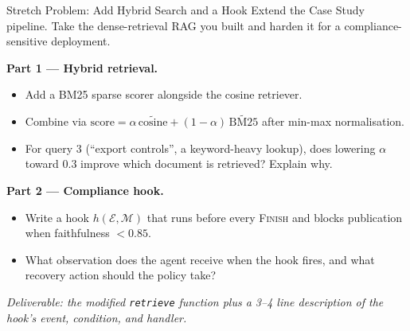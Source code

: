 \documentclass[9pt,t]{beamer}
\begin{document}
\begin{frame}[noframenumbering]{Stretch Problem: Add Hybrid Search and a Hook}
Extend the Case Study pipeline. Take the dense-retrieval RAG you built and harden it
for a compliance-sensitive deployment.

\medskip
\textbf{Part 1 --- Hybrid retrieval.}
\begin{itemize}
  \item Add a BM25 sparse scorer alongside the cosine retriever.
  \item Combine via $\text{score} = \alpha\,\widetilde{\text{cosine}}
        + (1-\alpha)\,\widetilde{\text{BM25}}$ after min-max normalisation.
  \item For query 3 (``export controls'', a keyword-heavy lookup), does lowering
        $\alpha$ toward $0.3$ improve which document is retrieved? Explain why.
\end{itemize}

\medskip
\textbf{Part 2 --- Compliance hook.}
\begin{itemize}
  \item Write a hook $h(\mathcal{E}, \mathcal{M})$ that runs before every
        \textsc{Finish} and blocks publication when faithfulness $< 0.85$.
  \item What observation does the agent receive when the hook fires, and what
        recovery action should the policy take?
\end{itemize}

\medskip
\textit{Deliverable: the modified \texttt{retrieve} function plus a 3--4 line
description of the hook's event, condition, and handler.}
\end{frame}
\end{document}

